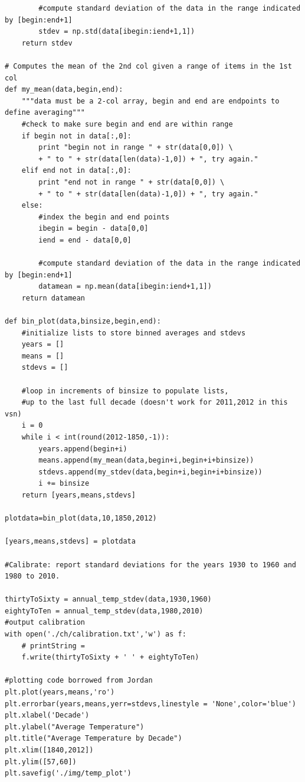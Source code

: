 \documentclass[12pt,a4paper]{article} %
\begin{document}
\begin{landscape}
\begin{verbatim}
        #compute standard deviation of the data in the range indicated by [begin:end+1]
        stdev = np.std(data[ibegin:iend+1,1])
    return stdev

# Computes the mean of the 2nd col given a range of items in the 1st col
def my_mean(data,begin,end):
    """data must be a 2-col array, begin and end are endpoints to define averaging"""
    #check to make sure begin and end are within range
    if begin not in data[:,0]:
        print "begin not in range " + str(data[0,0]) \
        + " to " + str(data[len(data)-1,0]) + ", try again."
    elif end not in data[:,0]:
        print "end not in range " + str(data[0,0]) \
        + " to " + str(data[len(data)-1,0]) + ", try again."
    else:
        #index the begin and end points
        ibegin = begin - data[0,0]
        iend = end - data[0,0]
        
        #compute standard deviation of the data in the range indicated by [begin:end+1]
        datamean = np.mean(data[ibegin:iend+1,1])
    return datamean

def bin_plot(data,binsize,begin,end):
    #initialize lists to store binned averages and stdevs
    years = []
    means = []
    stdevs = []
    
    #loop in increments of binsize to populate lists, 
    #up to the last full decade (doesn't work for 2011,2012 in this vsn)
    i = 0
    while i < int(round(2012-1850,-1)):
        years.append(begin+i)
        means.append(my_mean(data,begin+i,begin+i+binsize))
        stdevs.append(my_stdev(data,begin+i,begin+i+binsize))
        i += binsize
    return [years,means,stdevs]

plotdata=bin_plot(data,10,1850,2012)

[years,means,stdevs] = plotdata

#Calibrate: report standard deviations for the years 1930 to 1960 and 1980 to 2010. 

thirtyToSixty = annual_temp_stdev(data,1930,1960)
eightyToTen = annual_temp_stdev(data,1980,2010)
#output calibration
with open('./ch/calibration.txt','w') as f:
    # printString =
    f.write(thirtyToSixty + ' ' + eightyToTen)

#plotting code borrowed from Jordan
plt.plot(years,means,'ro')
plt.errorbar(years,means,yerr=stdevs,linestyle = 'None',color='blue')
plt.xlabel('Decade')
plt.ylabel("Average Temperature")
plt.title("Average Temperature by Decade")
plt.xlim([1840,2012])
plt.ylim([57,60])
plt.savefig('./img/temp_plot')
\end{verbatim}
\end{landscape}
\end{document}
